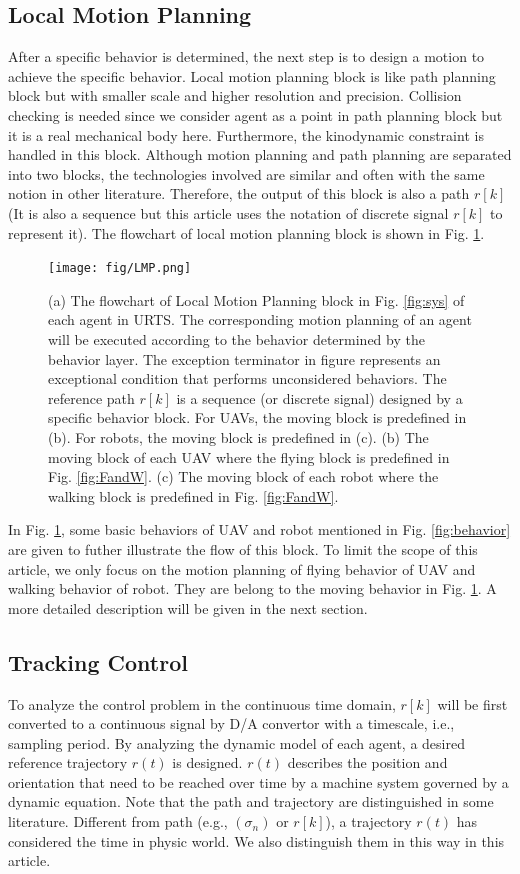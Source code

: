 \documentclass{ieeeaccess}
\begin{document}
\subsection{Local Motion Planning}
After a specific behavior is determined, the next step is to design a motion to achieve the specific behavior. Local motion planning block is like path planning block but with smaller scale and higher resolution and precision. Collision checking is needed since we consider agent as a point in path planning block but it is a real mechanical body here. Furthermore, the kinodynamic constraint is handled in this block. Although motion planning and path planning are separated into two blocks, the technologies involved are similar and often with the same notion in other literature. Therefore, the output of this block is also a path $r[k]$ (It is also a sequence but this article uses the notation of discrete signal $r[k]$ to represent it). The flowchart of local motion planning block is shown in Fig. \ref{fig:LMP}.
\begin{figure}[htbp]
    \centering
    \texttt{[image: fig/LMP.png]}\caption{
        (a) The flowchart of Local Motion Planning block in Fig. \ref{fig:sys} of each agent in URTS. The corresponding motion planning of an agent will be executed according to the behavior determined by the behavior layer. The exception terminator in figure represents an exceptional condition that performs unconsidered behaviors. The reference path $r[k]$ is a sequence (or discrete signal) designed by a specific behavior block. For UAVs, the moving block is predefined in (b). For robots, the moving block is predefined in (c). 
        (b) The moving block of each UAV where the flying block is predefined in Fig. \ref{fig:FandW}. 
        (c) The moving block of each robot where the walking block is predefined in Fig. \ref{fig:FandW}.}
    \label{fig:LMP}
\end{figure}

In Fig. \ref{fig:LMP}, some basic behaviors of UAV and robot mentioned in Fig. \ref{fig:behavior} are given to futher illustrate the flow of this block. To limit the scope of this article, we only focus on the motion planning of flying behavior of UAV and walking behavior of robot. They are belong to the moving behavior in Fig. \ref{fig:LMP}. A more detailed description will be given in the next section.

\subsection{Tracking Control}
To analyze the control problem in the continuous time domain, $r[k]$ will be first converted to a continuous signal by D/A convertor with a timescale, i.e., sampling period. By analyzing the dynamic model of each agent, a desired reference trajectory $r(t)$ is designed. $r(t)$ describes the position and orientation that need to be reached over time by a machine system governed by a dynamic equation. Note that the path and trajectory are distinguished in some literature. Different from path (e.g., $(\sigma_n)$ or $r[k]$), a trajectory $r(t)$ has considered the time in physic world. We also distinguish them in this way in this article.
\end{document}
